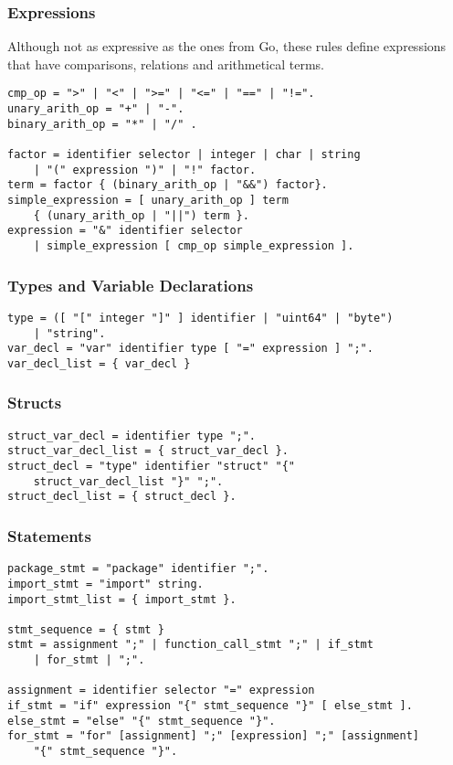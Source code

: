 \documentclass[a4paper]{scrreprt}
\begin{document}
      \subsubsection{Expressions}
        Although not as expressive as the ones from Go, these rules define expressions that have comparisons, relations and arithmetical terms. 

        \begin{lstlisting}[caption=Expressions]
cmp_op = ">" | "<" | ">=" | "<=" | "==" | "!=".
unary_arith_op = "+" | "-".
binary_arith_op = "*" | "/" .

factor = identifier selector | integer | char | string 
    | "(" expression ")" | "!" factor.	
term = factor { (binary_arith_op | "&&") factor}.
simple_expression = [ unary_arith_op ] term 
    { (unary_arith_op | "||") term }.
expression = "&" identifier selector 
    | simple_expression [ cmp_op simple_expression ].
        \end{lstlisting}

      \subsubsection{Types and Variable Declarations}

        \begin{lstlisting}[caption=Types]
type = ([ "[" integer "]" ] identifier | "uint64" | "byte") 
    | "string".
var_decl = "var" identifier type [ "=" expression ] ";".
var_decl_list = { var_decl }
        \end{lstlisting}

      \subsubsection{Structs}

        \begin{lstlisting}[caption=Structs]
struct_var_decl = identifier type ";".
struct_var_decl_list = { struct_var_decl }.
struct_decl = "type" identifier "struct" "{" 
    struct_var_decl_list "}" ";".
struct_decl_list = { struct_decl }. 
        \end{lstlisting}

      \subsubsection{Statements}

        \begin{lstlisting}[caption=Statements]
package_stmt = "package" identifier ";".
import_stmt = "import" string.
import_stmt_list = { import_stmt }.

stmt_sequence = { stmt }
stmt = assignment ";" | function_call_stmt ";" | if_stmt 
    | for_stmt | ";".

assignment = identifier selector "=" expression
if_stmt = "if" expression "{" stmt_sequence "}" [ else_stmt ].
else_stmt = "else" "{" stmt_sequence "}".
for_stmt = "for" [assignment] ";" [expression] ";" [assignment] 
    "{" stmt_sequence "}".
        \end{lstlisting}
\end{document}
